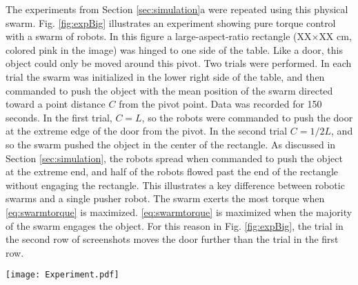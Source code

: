 The experiments from Section \ref{sec:simulation}a were repeated using this physical swarm.
Fig. \ref{fig:expBig} illustrates an experiment showing pure torque control with a swarm of robots. In this figure a large-aspect-ratio rectangle  (XX$\times$XX cm, colored pink in the image) was hinged to one side of the table.  Like a door, this object could only be moved around this pivot. 
Two trials were performed.  In each trial the swarm was initialized in the lower right side of the table, and then commanded to push the object with the mean position of the swarm directed toward a point distance $C$ from the pivot point. Data was recorded for 150 seconds.
In the first trial, $C = L$, so the robots were commanded to push the door at the extreme edge of the door from the pivot.  
In the second trial $C = 1/2 L$, and so the swarm pushed the object in the center of the rectangle.
As discussed in Section \ref{sec:simulation}, the robots spread when commanded to push the object at the extreme end, and half of the robots flowed past the end of the rectangle without engaging the rectangle.
 This illustrates a key difference between robotic swarms and a single pusher robot. The swarm exerts the most torque when  \eqref{eq:swarmtorque} is maximized.
  \eqref{eq:swarmtorque} is maximized when the majority of the swarm engages the object.
For this reason in Fig. \ref{fig:expBig}, the trial in the second row of screenshots moves the door further than the  trial in the  first row.
\begin{figure*}
\centering

\texttt{[image: Experiment.pdf]}
\vspace{-1em}
\caption{\label{fig:expBig}{Snapshots showing the effect of pushing a pivoted rectangular object at different distances from the pivot point. 
 97 robots were programmed to move toward the brightest light in the room, and   controlled by choosing which of 8 lights were on at any given instant. The top row of snapshots illustrate the swarm pushing at the end of the object.  In this case,  the swarm flows past the object and the force decreases. The bottom row illustrates that when the swarm pushes at the middle of the object the force provided by the swarm remains constant. In this case the swarm does not flow past the object. See video attachment for recordings of these experiments. }
}
\end{figure*}






